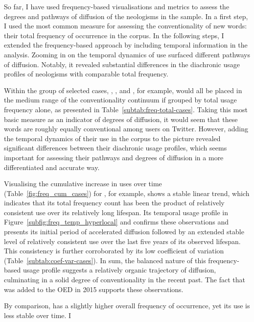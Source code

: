 \documentclass[
  a4paper,
  abstract=on,
  captions=tableabove
  ]{scrartcl}
\begin{document}
        So far, I have used frequency-based visualisations and metrics to assess the degrees and pathways of diffusion of the neologisms in the sample. In a first step, I used the most common measure for assessing the conventionality of new words: their total frequency of occurrence in the corpus. In the following steps, I extended the frequency-based approach by including temporal information in the analysis. Zooming in on the temporal dynamics of use surfaced different pathways of diffusion. Notably, it revealed substantial differences in the diachronic usage profiles of neologisms with comparable total frequency.

         Within the group of selected cases, , , and , for example, would all be placed in the medium range of the conventionality continuum if grouped by total usage frequency alone, as presented in Table~\ref{subtab:freq-total-cases}. Taking this most basic measure as an indicator of degrees of diffusion, it would seem that these words are roughly equally conventional among users on Twitter. However, adding the temporal dynamics of their use in the corpus to the picture revealed significant differences between their diachronic usage profiles, which seems important for assessing their pathways and degrees of diffusion in a more differentiated and accurate way.

        Visualising the cumulative increase in uses over time (Table~\ref{fig:freq_cum_cases}) for , for example, shows a stable linear trend, which indicates that its total frequency count has been the product of relatively consistent use over its relatively long lifespan. Its temporal usage profile in Figure~\ref{subfig:freq_temp_hyperlocal} and confirms these observations and presents its initial period of accelerated diffusion followed by an extended stable level of relatively consistent use over the last five years of its observed lifespan. This consistency is further corroborated by its low coefficient of variation (Table~\ref{subtab:coef-var-cases}). In sum, the balanced nature of this frequency-based usage profile suggests a relatively organic trajectory of diffusion, culminating in a solid degree of conventionality in the recent past. The fact that  was added to the OED in 2015 supports these observations.

        By comparison,  has a slightly higher overall frequency of occurrence, yet its use is less stable over time. I
\end{document}
